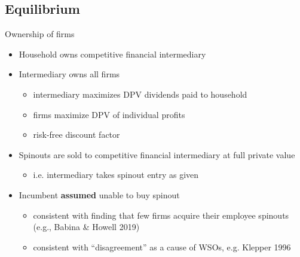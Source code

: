 \documentclass[english,usenames,dvipsnames]{beamer}
\begin{document}
\subsection{Equilibrium}

\begin{frame}{Ownership of firms}\label{model:firm_ownership}
	\hyperlink{definition:equilibrium}{}
	\begin{itemize}
		\item Household owns competitive financial intermediary
		\item Intermediary owns all firms
		\begin{itemize}
			\item intermediary maximizes DPV dividends paid to household
			\item firms maximize DPV of individual profits
			\item risk-free discount factor
		\end{itemize}
		\medskip
		\item Spinouts are sold to competitive financial intermediary at full private value
		\begin{itemize}
			\item i.e. intermediary takes spinout entry as given
		\end{itemize}
		\medskip
		\item Incumbent \alert{\textbf{assumed}} unable to buy spinout 
		\begin{itemize}
			\item consistent with finding that few firms acquire their employee spinouts (e.g., Babina \& Howell 2019)
			\item consistent with ``disagreement'' as a cause of WSOs, e.g. Klepper 1996 
		\end{itemize}
	\end{itemize}
\end{frame}
\end{document}
